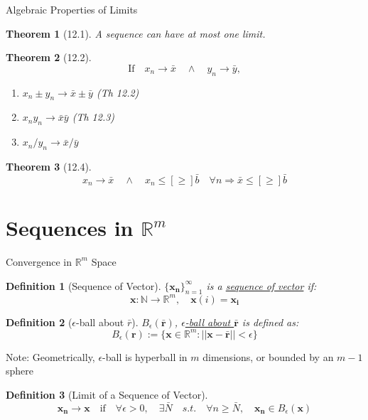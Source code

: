 \documentclass[a4paper,11pt]{article}
\newtheorem{defn}{Definition}
\newtheorem{thm}{Theorem}
\begin{document}
\begin{frame}[t]{Algebraic Properties of Limits}
	\begin{thm}
		[12.1] A sequence can have at most one limit.
	\end{thm}
	\begin{thm}
		[12.2]
		\[
			\text{If}\quad x_n \rightarrow \bar x \quad\land\quad y_n \rightarrow \bar y, 
		\]
		\begin{enumerate}
			\item $x_n\pm y_n \rightarrow \bar x \pm \bar y$ (Th 12.2)
			\item $x_n y_n \rightarrow \bar x \bar y$ (Th 12.3)
			\item $x_n / y_n \rightarrow \bar x / \bar y $
		\end{enumerate}
	\end{thm}
	\begin{thm}
		[12.4] \[
			x_n \rightarrow \bar x \quad\land\quad x_n \le[\ge] \bar b\quad\forall n \Rightarrow \bar x \le[\ge] \bar b 
		\]
	\end{thm}
\end{frame}

\section{Sequences in $\mathbb{R}^m$} %
\label{sec:sequences_in_mathbb_r_m}
\begin{frame}[t]{Convergence in $\mathbb{R}^m$ Space}
	\begin{defn}
		[Sequence of Vector]
		$\{\mathbf{x_n}\}_{n=1}^\infty$ is a \uline{sequence of vector} if:
		\[
			\mathbf{x}:\mathbb{N}\rightarrow \mathbb{R}^m,\quad \mathbf{x}(i) = \mathbf{x_i} 
		\]
	\end{defn}
	\begin{defn}
		[$\epsilon$-ball about $\bar r$]
		$B_\epsilon( \mathbf{\bar r})$, \uline{$\epsilon$-ball about $\mathbf{\bar  r}$} is defined as:
		\[
			B_\epsilon(\mathbf{r}):=\{\mathbf{x}\in\mathbb{R}^m: ||\mathbf{x-\bar r}||<\epsilon \}
		\]
	\end{defn}
	Note: Geometrically, $\epsilon$-ball is hyperball in $m$ dimensions, or bounded by an $m-1$ sphere
	\begin{defn}
		[Limit of a Sequence of Vector]
		\[
			\mathbf{x_n}\rightarrow\mathbf{x} \quad\text{if}\quad \forall\epsilon>0,\quad\exists \bar N \quad s.t.\quad \forall n\ge\bar N,\quad \mathbf{x_n}\in B_\epsilon(\mathbf{x})
		\]
	\end{defn}
\end{frame}
\end{document}
